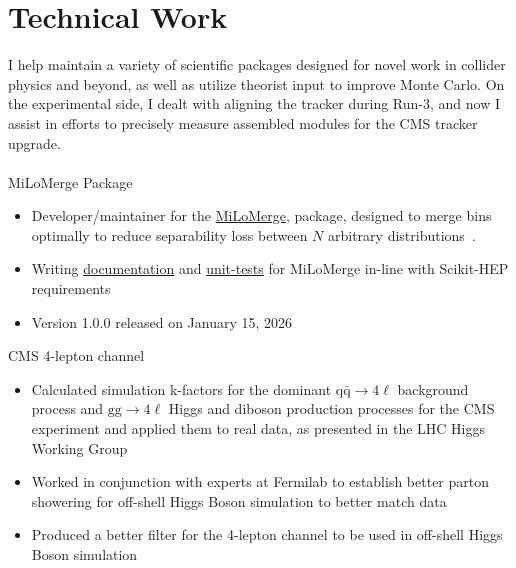 \documentclass[11pt,english,sans,colorlinks=true,citecolor=black]{moderncv}
\begin{document}
    \section{Technical Work}
    I help maintain a variety of scientific packages designed for novel work in 
    collider physics and beyond, as well as utilize theorist input to improve
    Monte Carlo. On the experimental side, I dealt with aligning the tracker
    during Run-3, and now I assist in efforts to precisely measure assembled
    modules for the CMS tracker upgrade.
    \qquad \\
    \qquad \\

    {MiLoMerge Package}
    {}{}{
        \begin{itemize}
            \item Developer/maintainer for the \href{https://pypi.org/project/MiLoMerge/}{MiLoMerge},
            package, designed to merge bins optimally to reduce separability loss
            between $N$ arbitrary distributions~\cite{davis2026}.
            \item Writing \href{https://spin.pha.jhu.edu/MiLoMerge/}{documentation}
            and \href{https://github.com/JHUGen/MiLoMerge/tree/master/tests}{unit-tests}
            for MiLoMerge in-line with Scikit-HEP requirements
            \item Version 1.0.0 released on January 15, 2026
        \end{itemize}
    }

    {CMS 4-lepton channel}
    {}{}{
        \begin{itemize}
            \item Calculated simulation k-factors for the
            dominant $\text{q}\bar{\text{q}} \to 4\ell$
            background process and $\text{gg} \to 4\ell$
            Higgs and diboson production processes
            for the CMS experiment and applied them to real data,
            as presented in the LHC Higgs Working Group~\cite{Srivastav:2972466}
            \item Worked in conjunction with experts at Fermilab to establish
            better parton showering for off-shell Higgs Boson simulation
            to better match data
            \item Produced a better filter for the 4-lepton channel
            to be used in off-shell Higgs Boson simulation
        \end{itemize}
    }
\end{document}
